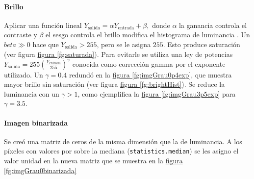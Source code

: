 \documentclass{article}
\begin{document}
\paragraph{Brillo}
Aplicar una función lineal 
$
Y_\mathrm{salida} = \alpha Y_\mathrm{entrada} + \beta ,
$
donde $\alpha$ la ganancia controla el contraste y $\beta$ el sesgo controla el brillo modifica el histograma de luminancia \cite{noauthor_opencv_nodate}.
Un \(beta \gg 0\) hace que \(Y_\mathrm{salida}> 255\), pero se le asigna \(255\).
Esto produce saturación (ver figura \hyperref[fg:saturada]{figura \ref*{fg:saturada}}).
Para evitarle se utiliza una ley de potencias
\(
Y_\mathrm{salida} = 255 \left( \frac{Y_\mathrm{entrada}}{255} \right)^\gamma  
\)
conocida como corrección gamma por el exponente utilizado.
Un \(\gamma= 0.4\) redundó en la \hyperref[fg:imgGrau0p4exp]{figura \ref*{fg:imgGrau0p4exp}}, que muestra mayor brillo sin saturación (ver figura \hyperref[fg:brightHist]{figura \ref*{fg:brightHist}}).
Se reduce la luminancia con un \(\gamma >1\), como ejemplifica la \hyperref[fg:imgGrau3p5exp]{figura \ref*{fg:imgGrau3p5exp}} para \(\gamma = 3.5\).



\paragraph{Imagen binarizada}	
Se creó una matriz de ceros de la misma dimensión que la de luminancia.
A los píxeles con valores por sobre la mediana (\verb'statistics.median') se les asigno el valor unidad en la nueva matriz que se muestra en la \hyperref[fg:imgGrau0binarizada]{figura \ref*{fg:imgGrau0binarizada}}
\end{document}
